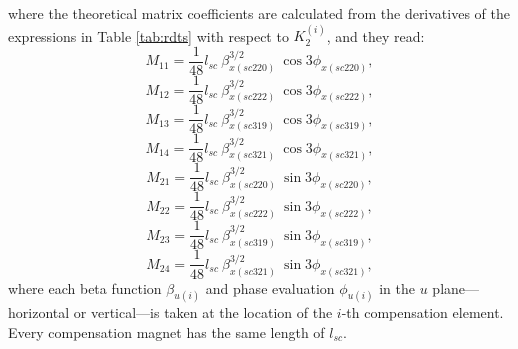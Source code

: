 where the theoretical matrix coefficients are calculated from the derivatives of the expressions in Table \ref{tab:rdts} with respect to $K_2^{(i)}$, and they read: 
\begin{equation}
    M_{11}=\frac{1}{48} l_{sc} \: \beta^{3/2}_{x(sc220)} \: \cos 3\phi_{x(sc220)},
    \label{eq:M11}
\end{equation}
\begin{equation}
    M_{12}=\frac{1}{48} l_{sc} \: \beta^{3/2}_{x(sc222)} \: \cos 3\phi_{x(sc222)},
    \label{eq:M12}
\end{equation}
\begin{equation}
    M_{13}=\frac{1}{48} l_{sc} \: \beta^{3/2}_{x(sc319)} \: \cos 3\phi_{x(sc319)},
    \label{eq:M13}
\end{equation}
\begin{equation}
    M_{14}=\frac{1}{48} l_{sc} \: \beta^{3/2}_{x(sc321)} \: \cos 3\phi_{x(sc321)},
    \label{eq:M14}
\end{equation}
\begin{equation}
    M_{21}=\frac{1}{48} l_{sc} \: \beta^{3/2}_{x(sc220)} \: \sin 3\phi_{x(sc220)},
    \label{eq:M21}
\end{equation}
\begin{equation}
    M_{22}=\frac{1}{48} l_{sc} \: \beta^{3/2}_{x(sc222)} \: \sin 3\phi_{x(sc222)},
    \label{eq:M22}
\end{equation}
\begin{equation}
    M_{23}=\frac{1}{48} l_{sc} \: \beta^{3/2}_{x(sc319)} \: \sin 3\phi_{x(sc319)},
    \label{eq:M23}
\end{equation}
\begin{equation}
    M_{24}=\frac{1}{48} l_{sc} \: \beta^{3/2}_{x(sc321)} \: \sin 3\phi_{x(sc321)},
    \label{eq:M24}
\end{equation}
where each beta function $\beta_{u(i)}$ and phase evaluation $\phi_{u(i)}$ in the $u$ plane---horizontal or vertical---is taken at the location of the $i$-th compensation element. Every compensation magnet has the same length of $l_{sc}$.


